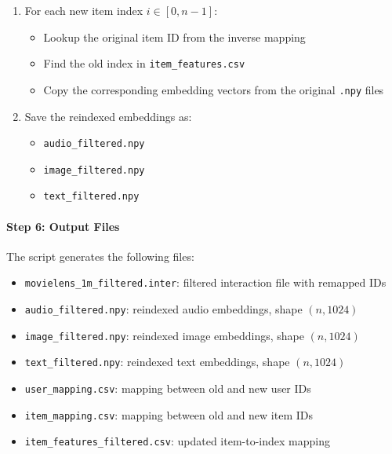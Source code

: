\begin{enumerate}
    \item For each new item index $i \in [0, n-1]$:
    \begin{itemize}
        \item Lookup the original item ID from the inverse mapping
        \item Find the old index in \texttt{item\_features.csv}
        \item Copy the corresponding embedding vectors from the original \texttt{.npy} files
    \end{itemize}
    \item Save the reindexed embeddings as:
    \begin{itemize}
        \item \texttt{audio\_filtered.npy}
        \item \texttt{image\_filtered.npy}
        \item \texttt{text\_filtered.npy}
    \end{itemize}
\end{enumerate}

\paragraph{Step 6: Output Files}
The script generates the following files:

\begin{itemize}
    \item \texttt{movielens\_1m\_filtered.inter}: filtered interaction file with remapped IDs
    \item \texttt{audio\_filtered.npy}: reindexed audio embeddings, shape $(n, 1024)$
    \item \texttt{image\_filtered.npy}: reindexed image embeddings, shape $(n, 1024)$
    \item \texttt{text\_filtered.npy}: reindexed text embeddings, shape $(n, 1024)$
    \item \texttt{user\_mapping.csv}: mapping between old and new user IDs
    \item \texttt{item\_mapping.csv}: mapping between old and new item IDs
    \item \texttt{item\_features\_filtered.csv}: updated item-to-index mapping
\end{itemize}


